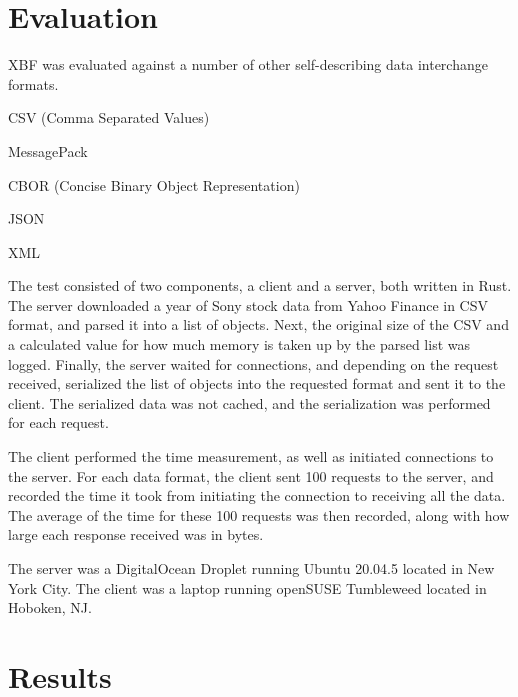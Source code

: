 \documentclass[conference]{IEEEtran}
\begin{document}
\section{Evaluation}

XBF was evaluated against a number of other self-describing data interchange formats.

\begin{IEEEitemize}
	\item CSV (Comma Separated Values)\cite{csv_spec}\cite{csv_parser}
	\item MessagePack\cite{msgpack_spec}\cite{msgpack_parser}
	\item CBOR (Concise Binary Object Representation)\cite{cbor_spec}\cite{cbor_parser}
	\item JSON\cite{json_parser}
	\item XML\cite{xml_parser}
\end{IEEEitemize}

The test consisted of two components, a client and a server, both written in Rust. The server downloaded a year of Sony stock data from Yahoo Finance\cite{sony_stock_data} in CSV format, and parsed it into a list of objects. Next, the original size of the CSV and a calculated value for how much memory is taken up by the parsed list was logged. Finally, the server waited for connections, and depending on the request received, serialized the list of objects into the requested format and sent it to the client. The serialized data was not cached, and the serialization was performed for each request.

The client performed the time measurement, as well as initiated connections to the server. For each data format, the client sent 100 requests to the server, and recorded the time it took from initiating the connection to receiving all the data. The average of the time for these 100 requests was then recorded, along with how large each response received was in bytes.

The server was a DigitalOcean Droplet\cite{digital_ocean} running Ubuntu 20.04.5 located in New York City. The client was a laptop running openSUSE Tumbleweed located in Hoboken, NJ.

\section{Results}
\end{document}
